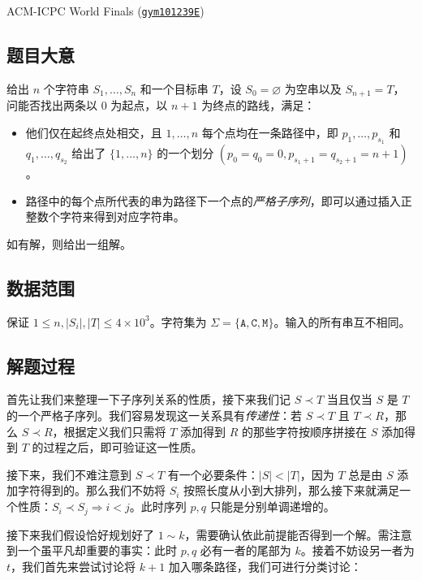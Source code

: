 \documentclass[12pt]{ctexart}
\begin{document}
\begin{source} ACM-ICPC World Finals (\href{https://codeforces.com/gym/101239/}{\texttt{gym101239E}})
\end{source}

\subsection{题目大意}

给出 $n$ 个字符串 $S_1, \dots, S_n$ 和一个目标串 $T$，设 $S_0=\varnothing$ 为空串以及 $S_{n+1}=T$，问能否找出两条以 $0$ 为起点，以 $n+1$ 为终点的路线，满足：

\begin{itemize}
\item 他们仅在起终点处相交，且 $1,\dots,n$ 每个点均在一条路径中，即 $p_1,\dots,p_{s_1}$ 和 $q_1,\dots,q_{s_2}$ 给出了 $\{1,\dots,n\}$ 的一个划分 $(p_0=q_0=0, p_{s_1+1}=q_{s_2+1}=n+1)$。
\item 路径中的每个点所代表的串为路径下一个点的\emph{严格子序列}，即可以通过插入正整数个字符来得到对应字符串。
\end{itemize}

如有解，则给出一组解。

\subsection{数据范围}

保证 $1\le n, |S_i|, |T|\le 4\times 10^3$。字符集为 $\Sigma = \{\texttt{A},\texttt{C},\texttt{M}\}$。输入的所有串互不相同。

\subsection{解题过程}

首先让我们来整理一下子序列关系的性质，接下来我们记 $S \prec T$ 当且仅当 $S$ 是 $T$ 的一个严格子序列。我们容易发现这一关系具有\emph{传递性}：若 $S\prec T$ 且 $T\prec R$，那么 $S\prec R$，根据定义我们只需将 $T$ 添加得到 $R$ 的那些字符按顺序拼接在 $S$ 添加得到 $T$ 的过程之后，即可验证这一性质。

接下来，我们不难注意到 $S\prec T$ 有一个必要条件：$|S|<|T|$，因为 $T$ 总是由 $S$ 添加字符得到的。那么我们不妨将 $S_i$ 按照长度从小到大排列，那么接下来就满足一个性质：$S_i \prec S_j \Rightarrow i < j$。此时序列 $p,q$ 只能是分别单调递增的。

接下来我们假设恰好规划好了 $1\sim k$，需要确认依此前提能否得到一个解。需注意到一个虽平凡却重要的事实：此时 $p,q$ 必有一者的尾部为 $k$。接着不妨设另一者为 $t$，我们首先来尝试讨论将 $k+1$ 加入哪条路径，我们可进行分类讨论：
\end{document}
